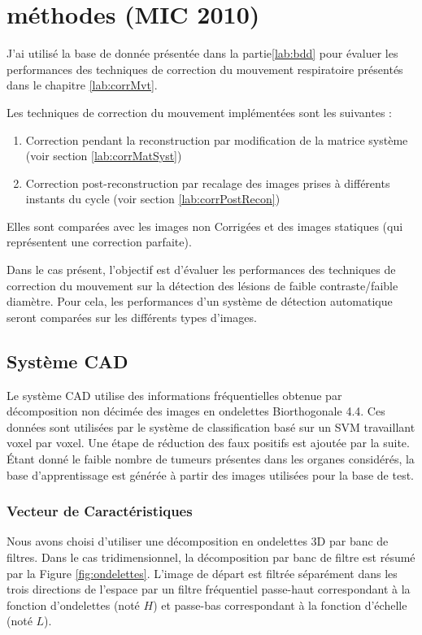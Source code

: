 \chapter{méthodes (MIC 2010)}

J'ai utilisé la base de donnée présentée dans la partie\ref{lab:bdd} pour évaluer les performances des techniques de correction du mouvement respiratoire présentés dans le chapitre \ref{lab:corrMvt}. 

Les techniques de correction du mouvement implémentées sont les suivantes :

\begin{enumerate}
 \item Correction pendant la reconstruction par modification de la matrice système (voir section \ref{lab:corrMatSyst})
 \item Correction post-reconstruction par recalage des images prises à différents instants du cycle (voir section \ref{lab:corrPostRecon})
\end{enumerate}

Elles sont comparées avec les images non Corrigées et des images statiques (qui représentent une correction parfaite).

Dans le cas présent, l'objectif est d'évaluer les performances des techniques de correction du mouvement sur la détection des lésions de faible contraste/faible diamètre. Pour cela, les performances d'un système de détection automatique seront comparées sur les différents types d'images.

\section{Système CAD}

Le système CAD utilise des informations fréquentielles obtenue par décomposition non décimée des images en ondelettes Biorthogonale 4.4. Ces données sont utilisées par le système de classification basé sur un SVM travaillant voxel par voxel. Une étape de réduction des faux positifs est ajoutée par la suite.
\'Etant donné le faible nombre de tumeurs présentes dans les organes considérés, la base d'apprentissage est générée à partir des images utilisées pour la base de test. 

\subsection{Vecteur de Caractéristiques}

Nous avons choisi d’utiliser une décomposition en ondelettes 3D par banc de filtres. Dans le cas tridimensionnel, la décomposition par banc de filtre est résumé par la Figure \ref{fig:ondelettes}. L’image de départ est filtrée séparément dans les trois directions de l’espace par un filtre fréquentiel passe-haut correspondant à la fonction d’ondelettes (noté $H$) et passe-bas correspondant à la fonction d’échelle (noté $L$). 

